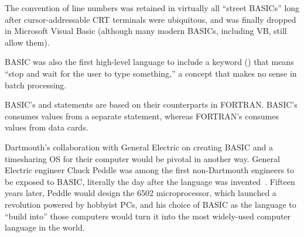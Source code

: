   \begin{tangent}
  The convention of line numbers was retained in virtually all ``street
  BASICs'' long after cursor-addressable CRT terminals were ubiquitous,
  and was finally dropped in Microsoft Visual Basic (although many modern
  BASICs, including VB, still allow them).
  \end{tangent}

BASIC was also the first high-level language to include a keyword
() that means ``stop and wait for
the user to type something,'' a concept that makes no sense in batch
processing. 

  \begin{tangent}
  BASIC's  and  statements are based on their
  counterparts in FORTRAN.  BASIC's  consumes values from a
  separate  statement, whereas FORTRAN's  consumes
  values from data cards.
  \end{tangent}

Dartmouth's  collaboration with General Electric on creating BASIC and a
timesharing OS for their computer would be pivotal in another way.
General Electric engineer Chuck Peddle was among the first non-Dartmouth
engineers to be exposed to
BASIC, literally the day after the language was
invented~\cite[p.~5]{commodore}.
Fifteen years later, Peddle would design the 6502 microprocessor, which launched
a revolution powered by hobbyist PCs, and his choice of BASIC as the
language to ``build into'' those computers would turn it into the most
widely-used computer language in the world.


